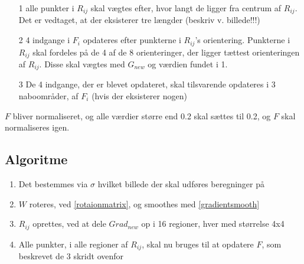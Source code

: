 \begin{itemize}
\item[1] alle punkter i $R_{ij}$ skal vægtes efter, hvor langt de ligger fra centrum af $R_{ij}$. Det er vedtaget, at der eksisterer tre længder (beskriv v. billede!!!)
\item[2] 4 indgange i $F_i$ opdateres efter punkterne i $R_{ij}$'s orientering. Punkterne i $R_{ij}$ skal fordeles på de 4 af de 8 orienteringer, der ligger tættest orienteringen af $R_{ij}$. Disse skal vægtes med $G_{new}$ og værdien fundet i 1. 
\item[3] De 4 indgange, der er blevet opdateret, skal tilsvarende opdateres i 3 naboområder, af $F_i$ (hvis der eksisterer nogen)
\end{itemize}

$F$ bliver normaliseret, og alle værdier større end 0.2 skal sættes til 0.2, og $F$ skal normaliseres igen.


\subsection*{Algoritme}
\begin{enumerate}
\item Det bestemmes via $\sigma$ hvilket billede der skal udføres beregninger på
\item $W$ roteres, ved \eqref{rotaionmatrix}, og smoothes med \eqref{gradientsmooth}
\item $R_{ij}$ oprettes, ved at dele $Grad_{new}$ op i 16 regioner, hver med størrelse 4x4
\item Alle punkter, i alle regioner af $R_{ij}$, skal nu bruges til at opdatere $F$, som beskrevet de 3 skridt ovenfor
\end{enumerate}